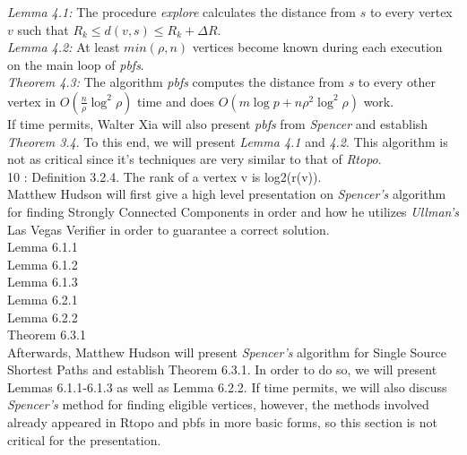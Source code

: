 \documentclass[paper=a4, fontsize=11pt]{scrartcl} %
\numberwithin{equation}{section} %
\numberwithin{figure}{section} %
\numberwithin{table}{section} %
\begin{document}
\textit{Lemma 4.1:} The procedure \textit{explore} calculates the distance from $s$ to every vertex $v$ such that $R_k \leq d(v,s) \leq R_k + \Delta{R}$.\\

\textit{Lemma 4.2:} At least $min(\rho,n)$ vertices become known during each execution on the main loop of \textit{pbfs}.\\

\textit{Theorem 4.3:} The algorithm \textit{pbfs} computes the distance from $s$ to every other vertex in $O(\frac{n}{\rho}\log^2{\rho})$ time and does $O(m\log{p} + n\rho^2\log^2{\rho})$ work.\\

If time permits, Walter Xia will also present \textit{pbfs} from \textit{Spencer\cite{S97}} and establish \textit{Theorem 3.4}. To this end, we will present \textit{Lemma 4.1} and \textit{4.2}. This algorithm is not as critical since it's techniques are very similar to that of \textit{Rtopo}.\\

10 : Definition 3.2.4. The rank of a vertex v is log2(r(v)).\\

Matthew Hudson will first give a high level presentation on \textit{Spencer's\cite{S97}} algorithm for finding Strongly Connected Components in order and how he utilizes \textit{Ullman's\cite{UY91}} Las Vegas Verifier in order to guarantee a correct solution.\\

Lemma 6.1.1\\

Lemma 6.1.2\\

Lemma 6.1.3\\

Lemma 6.2.1\\

Lemma 6.2.2\\

Theorem 6.3.1\\

Afterwards, Matthew Hudson will present \textit{Spencer's\cite{S97}} algorithm for Single Source Shortest Paths and establish Theorem 6.3.1. In order to do so, we will present Lemmas 6.1.1-6.1.3 as well as Lemma 6.2.2. If time permits, we will also discuss \textit{Spencer's\cite{S97}} method for finding eligible vertices, however, the methods involved already appeared in Rtopo and pbfs in more basic forms, so this section is not critical for the presentation.
\end{document}
